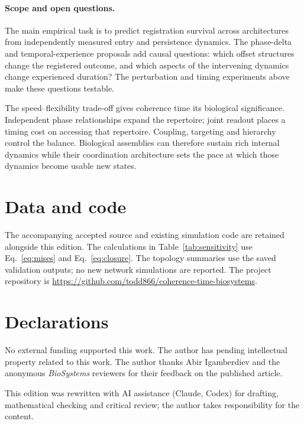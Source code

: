 \documentclass[11pt]{article}
\begin{document}
\paragraph{Scope and open questions.}
The main empirical task is to predict registration survival across
architectures from independently measured entry and persistence dynamics.
The phase-delta and temporal-experience proposals add causal questions:
which offset structures change the registered outcome, and which aspects
of the intervening dynamics change experienced duration? The perturbation
and timing experiments above make these questions testable.

The speed--flexibility trade-off gives coherence time its biological
significance. Independent phase relationships expand the repertoire;
joint readout places a timing cost on accessing that repertoire.
Coupling, targeting and hierarchy control the balance. Biological
assemblies can therefore sustain rich internal dynamics while their
coordination architecture sets the pace at which those dynamics become
usable new states.

\section*{Data and code}
The accompanying accepted source and existing simulation
code are retained alongside this edition. The calculations
in Table~\ref{tab:sensitivity} use Eq.~\ref{eq:mises} and
Eq.~\ref{eq:closure}. The topology summaries use the saved
validation outputs; no new network simulations are reported.
The project repository is
\url{https://github.com/todd866/coherence-time-biosystems}.

\section*{Declarations}
No external funding supported this work. The author has
pending intellectual property related to this work.
The author thanks Abir Igamberdiev and the anonymous
\textit{BioSystems} reviewers for their feedback on the
published article.

This edition was rewritten with AI assistance (Claude, Codex)
for drafting, mathematical checking and critical review;
the author takes responsibility for the content.



\end{document}
